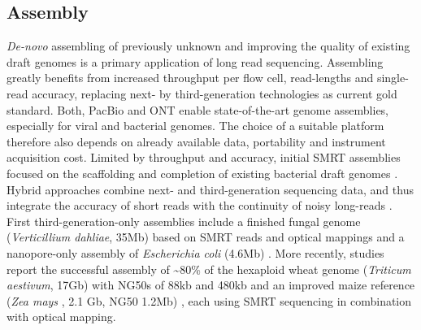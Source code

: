 \subsection{Assembly}
\label{subsec:state_of_art:assembly}

\textit{De-novo} assembling of previously unknown and improving the quality of existing draft genomes is a primary application of long read sequencing.
Assembling greatly benefits from increased throughput per flow cell, read-lengths and single-read accuracy, replacing next- by third-generation technologies as current gold standard.
Both, PacBio and ONT enable state-of-the-art genome assemblies, especially for viral and bacterial genomes.
The choice of a suitable platform therefore also depends on already available data, portability and instrument acquisition cost.
Limited by throughput and accuracy, initial SMRT assemblies focused on the scaffolding and completion of existing bacterial draft genomes \cite{English2012, Boetzer2014}.
Hybrid approaches combine next- and third-generation sequencing data, and thus integrate the accuracy of short reads with the continuity of noisy long-reads \cite{Bashir2012, Antipov2016}.
First third-generation-only assemblies include a finished fungal genome (\textit{Verticillium dahliae}, 35Mb) \cite{Faino2015} based on SMRT reads and optical mappings and a nanopore-only assembly of \textit{Escherichia coli} (4.6Mb) \cite{Loman2015}.
More recently, studies report the successful assembly of \textasciitilde80\% of the hexaploid wheat genome (\textit{Triticum aestivum}, 17Gb) with NG50s of 88kb and 480kb \cite{Clavijo2017, Zimin2017} and an improved maize reference (\textit{Zea mays }, 2.1 Gb, NG50 1.2Mb) \cite{Jiao2017}, each using SMRT sequencing in combination with optical mapping.
